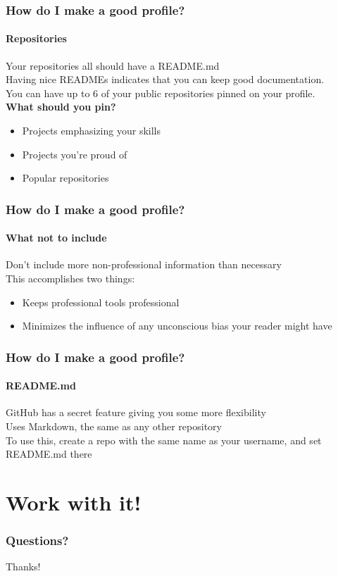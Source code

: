 \documentclass{beamer}
\begin{document}
\begin{frame}
  \frametitle{How do I make a good profile?}
  \framesubtitle{Repositories}
  Your repositories all should have a README.md\\\vspace{0.25em}
  Having nice READMEs indicates that you can keep good documentation.\\\pause\vspace{0.25em}
  You can have up to 6 of your public repositories pinned on your profile.\pause\\
  \textbf{What should you pin?}
  \begin{itemize}[<+->]
    \item Projects emphasizing your skills
    \item Projects you're proud of
    \item Popular repositories
  \end{itemize}
\end{frame}

\begin{frame}
  \frametitle{How do I make a good profile?}
  \framesubtitle{What not to include}
  Don't include more non-professional information than necessary\\\pause\vspace{0.25em}
  This accomplishes two things:
  \begin{itemize}[<+->]
    \item Keeps professional tools professional
    \item Minimizes the influence of any unconscious bias your reader might have
  \end{itemize}
\end{frame}

\begin{frame}
  \frametitle{How do I make a good profile?}
  \framesubtitle{README.md}
  GitHub has a secret feature giving you some more flexibility\\\vspace{0.25em}
  Uses Markdown, the same as any other repository\\\pause\vspace{0.25em}
  To use this, create a repo with the same name as your username, and set README.md there
\end{frame}

\section{Work with it!} %
\begin{frame}
  \frametitle{Questions?}
\end{frame}

\begin{frame}[plain]
  Thanks!
\end{frame}
\end{document}
